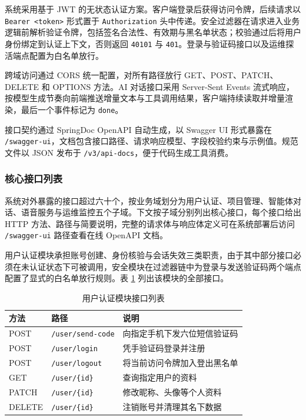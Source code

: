 \par 系统采用基于 JWT 的无状态认证方案。客户端登录后获得访问令牌，后续请求以 \texttt{Bearer <token>} 形式置于 \texttt{Authorization} 头中传递。安全过滤器在请求进入业务逻辑前解析验证令牌，包括签名合法性、有效期与黑名单状态；校验通过后将用户身份绑定到认证上下文，否则返回 \texttt{40101} 与 \texttt{401}。登录与验证码接口以及运维探活端点配置为白名单放行。

\par 跨域访问通过 CORS 统一配置，对所有路径放行 GET、POST、PATCH、DELETE 和 OPTIONS 方法。AI 对话接口采用 Server-Sent Events 流式响应，按模型生成节奏向前端推送增量文本与工具调用结果，客户端持续读取并增量渲染，最后一个事件标记为 \texttt{done}。

\par 接口契约通过 SpringDoc OpenAPI 自动生成，以 Swagger UI 形式暴露在 \texttt{/swagger-ui}，文档包含接口路径、请求响应模型、字段校验约束与示例值。规范文件以 JSON 发布于 \texttt{/v3/api-docs}，便于代码生成工具消费。

\subsubsection{核心接口列表}

\par 系统对外暴露的接口超过六十个，按业务域划分为用户认证、项目管理、智能体对话、语音服务与运维监控五个子域。下文按子域分别列出核心接口，每个接口给出 HTTP 方法、路径与简要说明，完整的请求体与响应体定义可在系统部署后访问 \texttt{/swagger-ui} 路径查看在线 OpenAPI 文档。

\par 用户认证模块承担账号创建、身份核验与会话失效三类职责，由于其中部分接口必须在未认证状态下可被调用，安全模块在过滤器链中为登录与发送验证码两个端点配置了显式的白名单放行规则。表 \ref{tab:api-user} 列出该模块的全部接口。

\begin{table}[htbp]
  \centering
  \caption{用户认证模块接口列表}
  \label{tab:api-user}
  \begin{tabular}{p{2cm}p{5cm}p{6cm}}
    \hline
    方法 & 路径 & 说明 \\
    \hline
    POST & \texttt{/user/send-code} & 向指定手机下发六位短信验证码 \\
    POST & \texttt{/user/login} & 凭手验证码登录并注册 \\
    POST & \texttt{/user/logout} & 将当前访问令牌加入登出黑名单 \\
    GET & \texttt{/user/\{id\}} & 查询指定用户的资料 \\
    PATCH & \texttt{/user/\{id\}} & 修改昵称、头像等个人资料 \\
    DELETE & \texttt{/user/\{id\}} & 注销账号并清理其名下数据 \\
    \hline
  \end{tabular}
\end{table}

